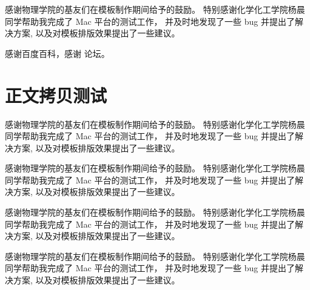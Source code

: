 \documentclass[pageheader,chapter,shorttitle,mathtxf]{njubachelor}
\begin{document}








%

\backmatter

\newpage
{}

\nocite{*}

%


\ack

感谢物理学院的基友们在模板制作期间给予的鼓励。
特别感谢化学化工学院杨晨同学帮助我完成了 Mac 平台的测试工作，
并及时地发现了一些 bug 并提出了解决方案,
以及对模板排版效果提出了一些建议。

感谢百度百科，感谢 \CTeX{} 论坛。


\appendix

\chapter{正文拷贝测试}

\songti

感谢物理学院的基友们在模板制作期间给予的鼓励。
特别感谢化学化工学院杨晨同学帮助我完成了 Mac 平台的测试工作，
并及时地发现了一些 bug 并提出了解决方案,
以及对模板排版效果提出了一些建议。

\heiti
感谢物理学院的基友们在模板制作期间给予的鼓励。
特别感谢化学化工学院杨晨同学帮助我完成了 Mac 平台的测试工作，
并及时地发现了一些 bug 并提出了解决方案,
以及对模板排版效果提出了一些建议。

\kaishu
感谢物理学院的基友们在模板制作期间给予的鼓励。
特别感谢化学化工学院杨晨同学帮助我完成了 Mac 平台的测试工作，
并及时地发现了一些 bug 并提出了解决方案,
以及对模板排版效果提出了一些建议。

\fangsong
感谢物理学院的基友们在模板制作期间给予的鼓励。
特别感谢化学化工学院杨晨同学帮助我完成了 Mac 平台的测试工作，
并及时地发现了一些 bug 并提出了解决方案,
以及对模板排版效果提出了一些建议。
\end{document}

